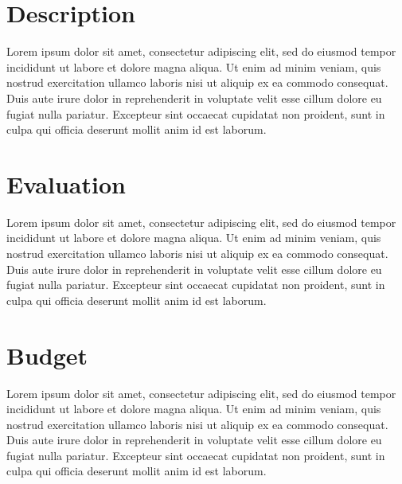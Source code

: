 \documentclass[a4paper, 12pt]{report}
\begin{document}
	
	\section*{Description}
	Lorem ipsum dolor sit amet, consectetur adipiscing elit, sed do eiusmod tempor incididunt ut labore et dolore magna aliqua. Ut enim ad minim veniam, quis nostrud exercitation ullamco laboris nisi ut aliquip ex ea commodo consequat. Duis aute irure dolor in reprehenderit in voluptate velit esse cillum dolore eu fugiat nulla pariatur. Excepteur sint occaecat cupidatat non proident, sunt in culpa qui officia deserunt mollit anim id est laborum.
	\vspace{1cm}
	
	
	\section*{Evaluation}
	Lorem ipsum dolor sit amet, consectetur adipiscing elit, sed do eiusmod tempor incididunt ut labore et dolore magna aliqua. Ut enim ad minim veniam, quis nostrud exercitation ullamco laboris nisi ut aliquip ex ea commodo consequat. Duis aute irure dolor in reprehenderit in voluptate velit esse cillum dolore eu fugiat nulla pariatur. Excepteur sint occaecat cupidatat non proident, sunt in culpa qui officia deserunt mollit anim id est laborum.
	\vspace{1cm}	
	
	
	\section*{Budget}
	Lorem ipsum dolor sit amet, consectetur adipiscing elit, sed do eiusmod tempor incididunt ut labore et dolore magna aliqua. Ut enim ad minim veniam, quis nostrud exercitation ullamco laboris nisi ut aliquip ex ea commodo consequat. Duis aute irure dolor in reprehenderit in voluptate velit esse cillum dolore eu fugiat nulla pariatur. Excepteur sint occaecat cupidatat non proident, sunt in culpa qui officia deserunt mollit anim id est laborum.
	\vspace{5cm}	
	
	
	\DTMToday
\end{document}
